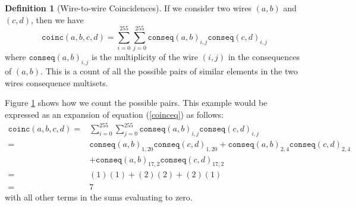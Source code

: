 \documentclass[12pt]{article}
\theoremstyle{definition}
\newtheorem{definition}{Definition}%
\theoremstyle{remark}
\theoremstyle{remark}
\begin{document}
\begin{definition}[Wire-to-wire Coincidences]
	If we consider two wires $(a,b)$ and $(c,d)$, then we have
	\begin{equation}
		\label{coinceq}
		\texttt{coinc}(a,b,c,d)=\sum^{255}_{i=0} \sum^{255}_{j=0} \texttt{conseq}(a,b)_{i,j} \texttt{conseq}(c,d)_{i,j}
	\end{equation}
	where $\texttt{conseq}(a,b)_{i,j}$ is the multiplicity of the wire $(i,j)$ in the consequences of $(a,b)$.
	This is a count of all the possible pairs of similar elements in the two wires consequence multisets. 
\end{definition}
\begin{figure}[h!]
	\centering
	\caption{}
	\label{coincfig}
\end{figure}

\par
Figure \ref{coincfig} shows how we count the possible pairs. This example would be expressed as an expansion of equation (\ref{coinceq}) as follows:
\begin{equation}
\begin{split}
	\texttt{coinc}(a,b,c,d) =& \sum^{255}_{i=0} \sum^{255}_{j=0} \texttt{conseq}(a,b)_{i,j} \texttt{conseq}(c,d)_{i,j} \\ =& \texttt{conseq}(a,b)_{1,20} \texttt{conseq}(c,d)_{1,20} + \texttt{conseq}(a,b)_{2,4} \texttt{conseq}(c,d)_{2,4} \\ & + \texttt{conseq}(a,b)_{17,2} \texttt{conseq}(c,d)_{17,2} \\  = & (1)(1) + (2)(2) + (2)(1) \\  = & 7
\end{split}
\end{equation}
with all other terms in the sums evaluating to zero.
\end{document}
